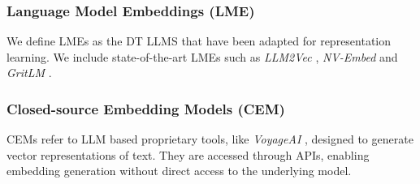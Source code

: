 \subsubsection{Language Model Embeddings (LME)}
We define LMEs as the DT LLMS that have been adapted for representation learning. We include state-of-the-art LMEs such as \textit{LLM2Vec} \cite{parishad2024llm2vec}, \textit{NV-Embed} \cite{lee2024nvembed} and \textit{GritLM} \cite{muennighoff2024gritlm}.
\subsubsection{Closed-source Embedding Models (CEM)}
CEMs refer to LLM based proprietary tools, like \textit{VoyageAI} \cite{voyageai2024embeddings}, designed to generate vector representations of text. They are accessed through APIs, enabling embedding generation without direct access to the underlying model. 